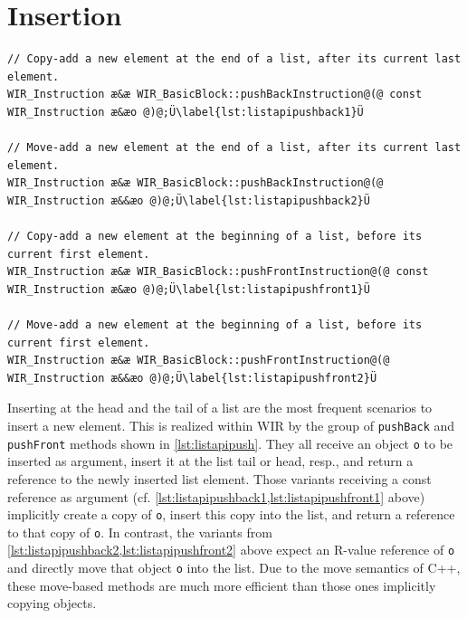 \section{Insertion}
\label{sec:listinsertion}

\begin{lstlisting}[style=code,float=!b,caption={Insertion of WIR Objects at List Heads and Tails},label=lst:listapipush]
// Copy-add a new element at the end of a list, after its current last element.
WIR_Instruction æ&æ WIR_BasicBlock::pushBackInstruction@(@ const WIR_Instruction æ&æo @)@;Ü\label{lst:listapipushback1}Ü

// Move-add a new element at the end of a list, after its current last element.
WIR_Instruction æ&æ WIR_BasicBlock::pushBackInstruction@(@ WIR_Instruction æ&&æo @)@;Ü\label{lst:listapipushback2}Ü

// Copy-add a new element at the beginning of a list, before its current first element.
WIR_Instruction æ&æ WIR_BasicBlock::pushFrontInstruction@(@ const WIR_Instruction æ&æo @)@;Ü\label{lst:listapipushfront1}Ü

// Move-add a new element at the beginning of a list, before its current first element.
WIR_Instruction æ&æ WIR_BasicBlock::pushFrontInstruction@(@ WIR_Instruction æ&&æo @)@;Ü\label{lst:listapipushfront2}Ü
\end{lstlisting}

Inserting at the head and the tail of a list are the most frequent scenarios to insert a new element.
This is realized within \gls{WIR} by the group of \texttt{pushBack} and \texttt{pushFront} methods shown in \cref{lst:listapipush}.
They all receive an object \texttt{o} to be inserted as argument, insert it at the list tail or head, resp., and return a reference to the newly inserted list element.
Those variants receiving a const reference as argument (cf. \cref{lst:listapipushback1,lst:listapipushfront1} above) implicitly create a copy of \texttt{o}, insert this copy into the list, and return a reference to that copy of \texttt{o}.
In contrast, the variants from \cref{lst:listapipushback2,lst:listapipushfront2} above expect an R-value reference of \texttt{o} and directly move that object \texttt{o} into the list.
Due to the move semantics of C++, these move-based methods are much more efficient than those ones implicitly copying objects.

